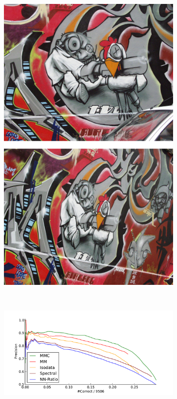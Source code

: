 \begin{figure}[t]
    \centering
    \begin{subfigure}[c]{0.18\textwidth}
        \includegraphics[width=\textwidth]{images/graf}
	\end{subfigure}%
	~ %
    \begin{subfigure}[c]{0.76\textwidth}
	\includegraphics[width=\columnwidth]{images/result_graf}

\end{subfigure}
\end{figure}
